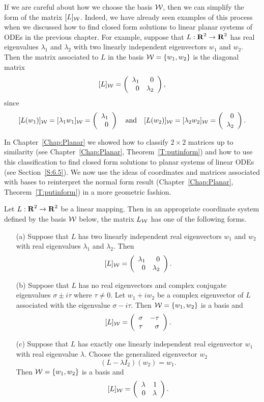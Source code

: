 If we are careful about how we choose the basis ${\cal W}$, then
we can simplify the form of the matrix $[L]_{\cal W}$.  Indeed, we
have already seen examples of this process when we discussed how
to find closed form solutions to linear planar systems of ODEs in
the previous chapter.  For example, suppose that $L:\mbox{$\bf{R}$}^2\to\mbox{$\bf{R}$}^2$
has real eigenvalues $\lambda_1$ and $\lambda_2$ with two
linearly independent eigenvectors $w_1$ and $w_2$.  Then the
matrix associated to $L$ in the basis ${\cal W} = \{w_1,w_2\}$
is the diagonal matrix
\begin{equation}   \label{e:diagcoord}
[L]_{\cal W} = \left(\begin{array}{rr} \lambda_1 & 0\\ 0 &\lambda_2\end{array}\right),
\end{equation}
since
\[
[L(w_1)]_{\cal W} = [\lambda_1w_1]_{\cal W} = \left(\begin{array}{r} \lambda_1 \\ 0\end{array}\right) \quad\mbox{and}\quad
[L(w_2)]_{\cal W} = [\lambda_2w_2]_{\cal W} = \left(\begin{array}{r} 0 \\ \lambda_2\end{array}\right).
\]

In Chapter~\ref{Chap:Planar} we showed how to classify $2\times 2$
matrices up to similarity (see Chapter~\ref{Chap:Planar},
Theorem~\ref{T:putinform}) and how to use this classification to find
closed form solutions to planar systems of linear ODEs (see
Section~\ref{S:6.5}).  We now use
the ideas of coordinates and matrices associated with bases to
reinterpret the normal form result (Chapter~\ref{Chap:Planar},
Theorem~\ref{T:putinform}) in a more geometric fashion.

\begin{thm}  \label{T:putinform2}
Let $L:\mbox{$\bf{R}$}^2\to\mbox{$\bf{R}$}^2$ be a linear mapping.  Then in an appropriate
coordinate system defined by the basis ${\cal W}$ below, the matrix
$L_{\cal W}$ has one of the following forms.
\begin{itemize}
\item[(a)]	Suppose that $L$ has two linearly independent
real eigenvectors $w_1$ and $w_2$ with real eigenvalues $\lambda_1$
and $\lambda_2$.  Then
\[
[L]_{\cal W} = \left(\begin{array}{rr} \lambda_1 & 0\\ 0 &\lambda_2\end{array}\right).
\]

\item[(b)]	Suppose that $L$ has no real eigenvectors and
complex conjugate eigenvalues $\sigma\pm i\tau$ where
$\tau\neq 0$.  Let $w_1+iw_2$ be a complex eigenvector of $L$
associated with the eigenvalue $\sigma-i\tau$.
Then ${\cal W}=\{w_1,w_2\}$ is a basis and
\[
[L]_{\cal W} = \left(\begin{array}{rr} \sigma & -\tau\\ \tau &\sigma\end{array}\right).
\]

\item[(c)]	Suppose that $L$ has exactly one linearly
independent real eigenvector $w_1$ with real eigenvalue $\lambda$.
Choose the generalized eigenvector $w_2$
\begin{equation}  \label{e:Lw=lw+v}
(L-\lambda I_2)(w_2) =  w_1.
\end{equation}
Then ${\cal W}=\{w_1,w_2\}$ is a basis and
\[
[L]_{\cal W} = \left(\begin{array}{rr} \lambda & 1\\ 0 &\lambda\end{array}\right).
\]
\end{itemize}
\end{thm}

